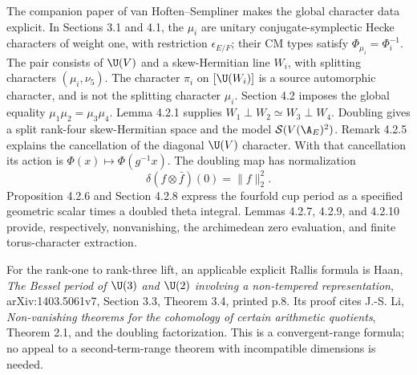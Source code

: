 The companion paper of van Hoften--Sempliner makes the global character
data explicit. In Sections 3.1 and 4.1, the $\mu_i$ are unitary
conjugate-symplectic Hecke characters of weight one, with restriction
$\epsilon_{E/F}$; their CM types satisfy
$\Phi_{\mu_i}=\Phi_i^{-1}$. The pair consists of $\U(V)$ and a
skew-Hermitian line $W_i$, with splitting characters $(\mu_i,\nu_5)$.
The character $\pi_i$ on $[\U(W_i)]$ is a source automorphic character,
and is not the splitting character $\mu_i$. Section 4.2 imposes the
global equality $\mu_1\mu_2=\mu_3\mu_4$. Lemma 4.2.1 supplies
$W_1\perp W_2\simeq W_3\perp W_4$. Doubling gives a split rank-four
skew-Hermitian space and the model $\mathcal S(V(\A_E)^2)$.
Remark 4.2.5 explains the cancellation of the diagonal $\U(V)$ character.
With that cancellation its action is $\Phi(x)\mapsto\Phi(g^{-1}x)$.
The doubling map has normalization
\[
 \delta(f\otimes\bar f)(0)=\|f\|_2^2.
\]
Proposition 4.2.6 and Section 4.2.8 express the fourfold cup period as a
specified geometric scalar times a doubled theta integral. Lemmas
4.2.7, 4.2.9, and 4.2.10 provide, respectively, nonvanishing, the
archimedean zero evaluation, and finite torus-character extraction.

For the rank-one to rank-three lift, an applicable explicit Rallis
formula is Haan, \emph{The Bessel period of $\U(3)$ and $\U(2)$ involving
a non-tempered representation}, arXiv:1403.5061v7, Section 3.3,
Theorem 3.4, printed p.8. Its proof cites J.-S. Li, \emph{Non-vanishing
theorems for the cohomology of certain arithmetic quotients}, Theorem
2.1, and the doubling factorization. This is a convergent-range
formula; no appeal to a second-term-range theorem with incompatible
dimensions is needed.

